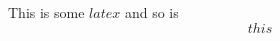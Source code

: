 \documentclass[crop,dvisvgm]{standalone}
\begin{document}
        This is some $latex$ and so is $$this$$
      
\end{document}
